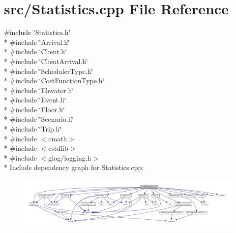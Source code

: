 \section{src/\+Statistics.cpp File Reference}
\label{_statistics_8cpp}
{\ttfamily \#include \char`\"{}Statistics.\+h\char`\"{}}\\*
{\ttfamily \#include \char`\"{}Arrival.\+h\char`\"{}}\\*
{\ttfamily \#include \char`\"{}Client.\+h\char`\"{}}\\*
{\ttfamily \#include \char`\"{}Client\+Arrival.\+h\char`\"{}}\\*
{\ttfamily \#include \char`\"{}Scheduler\+Type.\+h\char`\"{}}\\*
{\ttfamily \#include \char`\"{}Cost\+Function\+Type.\+h\char`\"{}}\\*
{\ttfamily \#include \char`\"{}Elevator.\+h\char`\"{}}\\*
{\ttfamily \#include \char`\"{}Event.\+h\char`\"{}}\\*
{\ttfamily \#include \char`\"{}Floor.\+h\char`\"{}}\\*
{\ttfamily \#include \char`\"{}Scenario.\+h\char`\"{}}\\*
{\ttfamily \#include \char`\"{}Trip.\+h\char`\"{}}\\*
{\ttfamily \#include $<$cmath$>$}\\*
{\ttfamily \#include $<$cstdlib$>$}\\*
{\ttfamily \#include $<$glog/logging.\+h$>$}\\*
Include dependency graph for Statistics.\+cpp\+:
\nopagebreak
\begin{figure}[H]
\begin{center}
\leavevmode
\includegraphics[width=350pt]{_statistics_8cpp__incl}
\end{center}
\end{figure}
